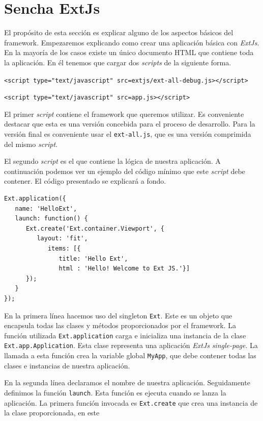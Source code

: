 \section{Sencha ExtJs}
	El propósito de esta sección es explicar alguno de los aspectos básicos del framework. Empezaremos explicando como crear una aplicación básica
	con \emph{ExtJs}. En la mayoría de los casos existe un único documento HTML\cite{HTML} que contiene toda la aplicación. En él tenemos que cargar dos
	\emph{scripts} de la siguiente forma.
    		\begin{center} \texttt{<script type="text/javascript" src=\textquotedbl extjs/ext-all-debug.js\textquotedbl ></script>}  \end{center}
    		\begin{center} \texttt{<script type="text/javascript" src=\textquotedbl app.js\textquotedbl ></script>}  \end{center}
	El primer \emph{script} contiene el framework que queremos utilizar. Es conveniente destacar que esta es una versión concebida para el proceso
	de desarrollo. Para la versión final es conveniente usar el \texttt{ext-all.js}, que es una versión comprimida del mismo \emph{script}.
 	\par
	El segundo \emph{script} es el que contiene la lógica de nuestra aplicación. A continuación podemos ver un ejemplo del código mínimo que este
	\emph{script} debe contener. El código presentado se explicará a fondo.
	\begin{lstlisting}[style=myJs]
Ext.application({
   name: 'HelloExt',
   launch: function() {
      Ext.create('Ext.container.Viewport', {
         layout: 'fit',
            items: [{
               title: 'Hello Ext',
               html : 'Hello! Welcome to Ext JS.'}] 
      }); 
   } 
});
	\end{lstlisting}
	\par
	En la primera línea hacemos uso del singleton \texttt{Ext}. Este es un objeto que encapsula todas las clases y métodos proporcionados por el
	framework. La función utilizada \texttt{Ext.application} carga e inicializa una instancia de la clase \texttt{Ext.app.Application}. Esta clase
	representa una aplicación \emph{ExtJs} \emph{single-page}. La llamada a esta función crea la variable global \texttt{MyApp}, que debe contener todas las
	clases e instancias de nuestra aplicación.
 	\par
	En la segunda línea declaramos el nombre de nuestra aplicación. Seguidamente definimos la función \texttt{launch}. Esta función es ejecuta
	cuando se lanza la aplicación. La primera función invocada es \texttt{Ext.create} que crea una instancia de la clase proporcionada, en este
